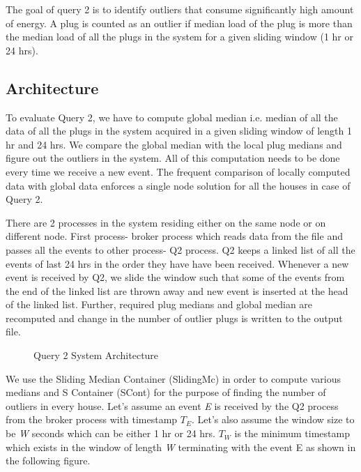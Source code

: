 The goal of query 2 is to identify outliers that consume significantly high amount of energy. A plug is counted as an outlier if median load of the plug is more than the median load of all the plugs in the system for a given sliding window (1 hr or 24 hrs).

\subsection{Architecture}
To evaluate Query 2, we have to compute global median i.e. median of all the data of all the plugs in the system acquired in a given sliding window of length 1 hr and 24 hrs. We compare the global median with the local plug medians and figure out the outliers in the system. All of this computation needs to be done every time we receive a new event. The frequent comparison of locally computed data with global data enforces a single node solution for all the houses in case of Query 2.

There are 2 processes in the system residing either on the same node or on different node. First process- broker process which reads data from the file and passes all the events to other process- Q2 process. Q2 keeps a linked list of all the events of last 24 hrs in the order they have have been received. Whenever a new event is received by Q2, we slide the window such that some of the events from the end of the linked list are thrown away and new event is inserted at the head of the linked list. Further, required plug medians and global median are recomputed and change in the number of outlier plugs is written to the output file.

\begin{figure}[h]
\begin{center}
\caption{Query 2 System Architecture}
\end{center}
\end{figure}

We use the Sliding Median Container (SlidingMc) in order to compute various medians and S Container (SCont) for the purpose of finding the number of outliers in every house. Let's assume an event \textit{E} is received by the Q2 process from the broker process with timestamp \textit{$T_E$}. Let's also assume the window size to be \textit{W} seconds which can be either 1 hr or 24 hrs. \textit{$T_W$} is the minimum timestamp which exists in the window of length \textit{W} terminating with the event E as shown in the following figure.

